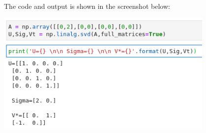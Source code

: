 The code and output is shown in the screenshot below:
\begin{center}
    \includegraphics[width=0.8\textwidth]{prob6-b.png}
\end{center}



